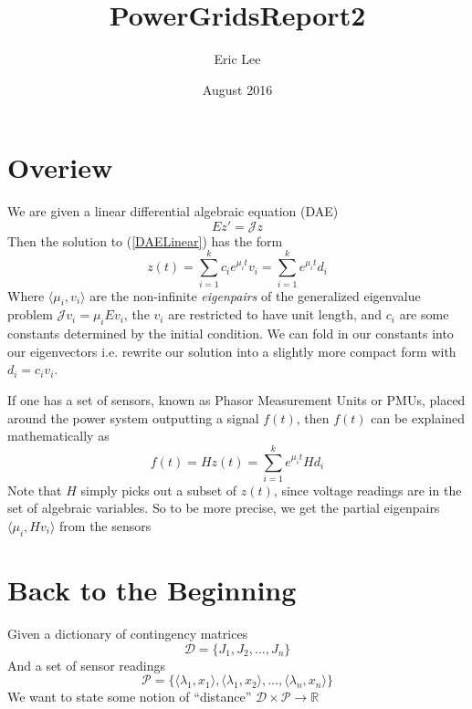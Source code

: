 

\title{PowerGridsReport2}
\author{Eric Lee }
\date{August 2016}


\section{Overiew}
We are given a linear differential algebraic equation (DAE)
\begin{equation} \label{DAELinear}
Ez' = \mathcal{J} z
\end{equation}
Then the solution to (\ref{DAELinear}) has the form
\begin{equation}\label{DAESolution}
z(t) = \sum_{i = 1}^{k} c_i e^{\mu_it}v_i = \sum_{i = 1}^{k} e^{\mu_it}d_i
\end{equation}
Where $\langle \mu_i,v_i \rangle$ are the non-infinite \textit{eigenpairs} of the generalized eigenvalue problem $\mathcal{J} v_i = \mu_i Ev_i $, the $v_i$ are restricted to have unit length, and $c_i$ are some constants determined by the initial condition. We can fold in our constants into our eigenvectors i.e. rewrite our solution into a slightly more compact form with $d_i = c_i v_i$. 

If one has a set of sensors, known as Phasor Measurement Units or PMUs, placed around the power system outputting a signal $f(t)$, then $f(t)$ can be explained mathematically as 
\begin{equation}\label{PMUSolution}
f(t) = Hz(t) = \sum_{i = 1}^{k} e^{\mu_it}Hd_i
\end{equation}
Note that $H$ simply picks out a subset of $z(t)$, since voltage readings are in the set of algebraic variables. So to be more precise, we get the partial eigenpairs 
$\langle \mu_i,Hv_i \rangle$ from the sensors


\section{Back to the Beginning}
Given a dictionary of contingency matrices
$$ \mathcal{D} =  \{ J_1, J_2, \dots, J_n \} $$
And a set of sensor readings 
$$ \mathcal{P} =  \{ \langle \lambda_1,x_1 \rangle, \langle \lambda_1,x_2 \rangle, \dots, \langle \lambda_n,x_n \rangle \} $$
We want to state some notion of ``distance'' $\mathcal{D} \times \mathcal{P} \rightarrow \mathbb{R}$ 

